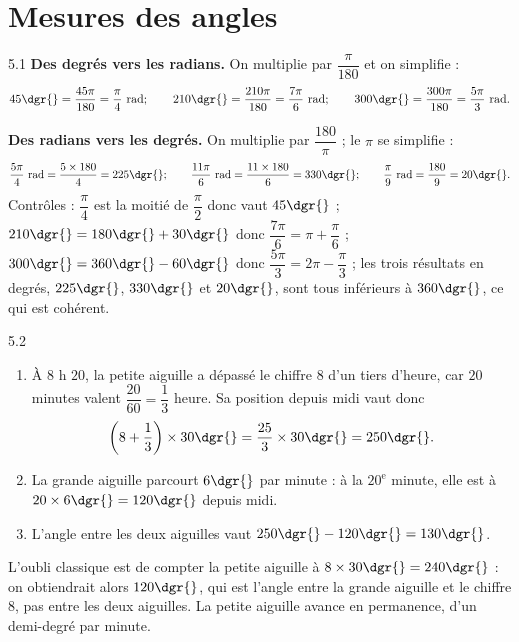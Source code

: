 \clearpage
\chapter{Mesures des angles}

\begin{corrige}{5.1}
\textbf{Des degrés vers les radians.} On multiplie par $\dfrac{\pi}{180}$ et on simplifie :
\[
45\dgr{} = \frac{45\pi}{180} = \frac{\pi}{4} \ \text{rad} ;
\qquad
210\dgr{} = \frac{210\pi}{180} = \frac{7\pi}{6} \ \text{rad} ;
\qquad
300\dgr{} = \frac{300\pi}{180} = \frac{5\pi}{3} \ \text{rad} .
\]

\textbf{Des radians vers les degrés.} On multiplie par $\dfrac{180}{\pi}$ ; le $\pi$ se simplifie :
\[
\frac{5\pi}{4} \ \text{rad} = \frac{5 \times 180}{4} = 225\dgr{} ;
\qquad
\frac{11\pi}{6} \ \text{rad} = \frac{11 \times 180}{6} = 330\dgr{} ;
\qquad
\frac{\pi}{9} \ \text{rad} = \frac{180}{9} = 20\dgr{} .
\]
Contrôles : $\dfrac{\pi}{4}$ est la moitié de $\dfrac{\pi}{2}$ donc vaut $45\dgr{}$ ; $210\dgr{} = 180\dgr{} + 30\dgr{}$ donc $\dfrac{7\pi}{6} = \pi + \dfrac{\pi}{6}$ ; $300\dgr{} = 360\dgr{} - 60\dgr{}$ donc $\dfrac{5\pi}{3} = 2\pi - \dfrac{\pi}{3}$ ; les trois résultats en degrés, $225\dgr{}$, $330\dgr{}$ et $20\dgr{}$, sont tous inférieurs à $360\dgr{}$, ce qui est cohérent.
\end{corrige}

\begin{corrige}{5.2}
\begin{enumerate}
\item À $8$ h $20$, la petite aiguille a dépassé le chiffre $8$ d'un tiers d'heure, car $20$ minutes valent $\dfrac{20}{60} = \dfrac{1}{3}$ heure. Sa position depuis midi vaut donc
\[
\left(8 + \frac{1}{3}\right) \times 30\dgr{} = \frac{25}{3} \times 30\dgr{} = 250\dgr{} .
\]
\item La grande aiguille parcourt $6\dgr{}$ par minute : à la $20^{\text{e}}$ minute, elle est à $20 \times 6\dgr{} = 120\dgr{}$ depuis midi.
\item L'angle entre les deux aiguilles vaut $250\dgr{} - 120\dgr{} = 130\dgr{}$.
\end{enumerate}
L'oubli classique est de compter la petite aiguille à $8 \times 30\dgr{} = 240\dgr{}$ : on obtiendrait alors $120\dgr{}$, qui est l'angle entre la grande aiguille et le chiffre $8$, pas entre les deux aiguilles. La petite aiguille avance en permanence, d'un demi-degré par minute.
\end{corrige}

